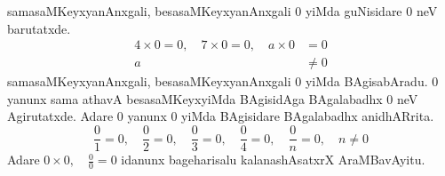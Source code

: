 samasaMKeyxyanAnxgali, besasaMKeyxyanAnxgali $0$ yiMda guNisidare  $0$ neV barutatxde.
\begin{align*}
4\times 0 = 0,\quad 7\times 0 = 0,\quad a\times 0 &= 0\\
 a &\neq 0
\end{align*}
samasaMKeyxyanAnxgali, besasaMKeyxyanAnxgali $0$ yiMda BAgisabAradu. $0$ yanunx sama athavA besasaMKeyxyiMda BAgisidAga BAgalabadhx $0$ neV Agirutatxde. Adare $0$ yanunx $0$ yiMda BAgisidare BAgalabadhx anidhARrita.
$$
\frac{0}{1} = 0, \quad \frac{0}{2}=0,\quad \frac{0}{3}=0, \quad \frac{0}{4}=0, \quad \frac{0}{n} = 0, \quad n\neq 0
$$
Adare $0\times 0,\quad \frac{0}{0}=0$ idanunx bageharisalu kalanashAsatxrX AraMBavAyitu.  
